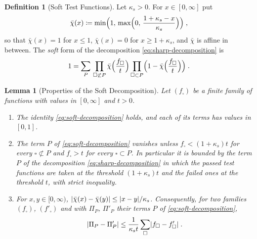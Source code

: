 \documentclass[11pt]{preprint}
\DeclarePairedDelimiter{\abs}{\lvert}{\rvert}
\numberwithin{equation}{section}
\newtheorem{lemma}[theorem]{Lemma}
\theoremstyle{definition}
\newtheorem{definition}[theorem]{Definition}
\theoremstyle{remark}
\theoremstyle{plain}
\begin{document}
\begin{definition}[Soft Test Functions]\label{def:soft-test-function}
Let $\kappa_s > 0$. For $x \in [0, \infty]$ put
\begin{equation}\label{eq:soft-function}
    \bar\chi(x) \coloneqq \min\Bigl(1,\, \max\Bigl(0,\, \frac{1 + \kappa_s - x}{\kappa_s}\Bigr)\Bigr)\;,
\end{equation}
so that $\bar\chi(x) = 1$ for $x \leq 1$, $\bar\chi(x) = 0$ for $x \geq 1 + \kappa_s$, and $\bar\chi$ is affine in between. The \emph{soft} form of the decomposition \eqref{eq:sharp-decomposition} is
\begin{equation}\label{eq:soft-decomposition}
    1 = \sum_{P}\,\prod_{\square \not\subset P}\bar\chi\Bigl(\frac{f_\square}{t}\Bigr)\prod_{\square \subset P}\Bigl(1 - \bar\chi\Bigl(\frac{f_\square}{t}\Bigr)\Bigr)\;.
\end{equation}
\end{definition}

\begin{lemma}[Properties of the Soft Decomposition]\label{lem:soft-decomposition}
Let $(f_\square)$ be a finite family of functions with values in $[0, \infty]$ and $t > 0$.
\begin{enumerate}[label=(\roman*)]
\item The identity \eqref{eq:soft-decomposition} holds, and each of its terms has values in $[0, 1]$.
\item The term $P$ of \eqref{eq:soft-decomposition} vanishes unless $f_\square < (1 + \kappa_s)t$ for every $\square \not\subset P$ and $f_\square > t$ for every $\square \subset P$. In particular it is bounded by the term $P$ of the decomposition \eqref{eq:sharp-decomposition} in which the passed test functions are taken at the threshold $(1 + \kappa_s)t$ and the failed ones at the threshold $t$, with strict inequality.
\item For $x, y \in [0, \infty)$, $\abs{\bar\chi(x) - \bar\chi(y)} \leq \abs{x - y}/\kappa_s$. Consequently, for two families $(f_\square)$, $(f'_\square)$ and with $\Pi_P$, $\Pi'_P$ their terms $P$ of \eqref{eq:soft-decomposition},
\begin{equation}\label{eq:soft-difference}
    \abs{\Pi_P - \Pi'_P} \leq \frac{1}{\kappa_st}\sum_{\square}\abs{f_\square - f'_\square}\;.
\end{equation}
\end{enumerate}
\end{lemma}
\end{document}
